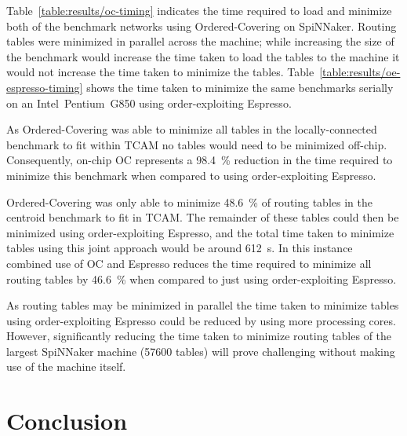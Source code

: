 \documentclass[conference]{IEEEtran}
\begin{document}
  Table~\ref{table:results/oc-timing} indicates the time required to load and minimize both of the benchmark networks using Ordered-Covering on SpiNNaker.
  Routing tables were minimized in parallel across the machine; while increasing the size of the benchmark would increase the time taken to load the tables to the machine it would not increase the time taken to minimize the tables.
  Table~\ref{table:results/oe-espresso-timing} shows the time taken to minimize the same benchmarks serially on an Intel~Pentium~G850 using order-exploiting Espresso.

  As Ordered-Covering was able to minimize all tables in the locally-connected benchmark to fit within TCAM no tables would need to be minimized off-chip.
  Consequently, on-chip OC represents a \SI{98.4}{\percent} reduction in the time required to minimize this benchmark when compared to using order-exploiting Espresso.

  Ordered-Covering was only able to minimize \SI{48.6}{\percent} of routing tables in the centroid benchmark to fit in TCAM.
  The remainder of these tables could then be minimized using order-exploiting Espresso, and the total time taken to minimize tables using this joint approach would be around \SI{612}{\second}.
  In this instance combined use of OC and Espresso reduces the time required to minimize all routing tables by \SI{46.6}{\percent} when compared to just using order-exploiting Espresso.

  As routing tables may be minimized in parallel the time taken to minimize tables using order-exploiting Espresso could be reduced by using more processing cores.
  However, significantly reducing the time taken to minimize routing tables of the largest SpiNNaker machine (\num{57600} tables) will prove challenging without making use of the machine itself.

    

  \section{Conclusion}
\end{document}
